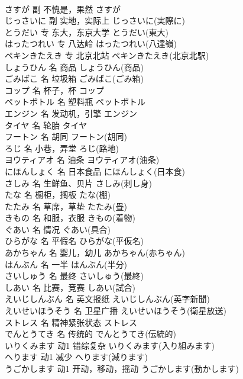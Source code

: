 \documentclass[8pt]{extreport}
\begin{document}
\begin{CJK}{UTF8}{min}
\\	さすが	副	不愧是，果然	さすが	
\\	じっさいに	副	实地，实际上	じっさいに(実際に)	
\\	とうだい	专	东大，东京大学	とうだい(東大)	
\\	はったつれい	专	八达岭	はったつれい(八達嶺)	
\\	ペキンきたえき	专	北京北站	ペキンきたえき(北京北駅)	
\\	しょうひん	名	商品	しょうひん(商品)	
\\	ごみばこ	名	垃圾箱	ごみばこ(ごみ箱)	
\\	コップ	名	杯子，杯	コップ	
\\	ペットボトル	名	塑料瓶	ペットボトル	
\\	エンジン	名	发动机，引擎	エンジン	
\\	タイヤ	名	轮胎	タイヤ	
\\	フートン	名	胡同	フートン(胡同)	
\\	ろじ	名	小巷，弄堂	ろじ(路地)	
\\	ヨウティアオ	名	油条	ヨウティアオ(油条)	
\\	にほんしょく	名	日本食品	にほんしょく(日本食)	
\\	さしみ	名	生鲜鱼、贝片	さしみ(刺し身)	
\\	たな	名	橱柜，搁板	たな(棚)	
\\	たたみ	名	草席，草垫	たたみ(畳)	
\\	きもの	名	和服，衣服	きもの(着物)	
\\	ぐあい	名	情况	ぐあい(具合)	
\\	ひらがな	名	平假名	ひらがな(平仮名)	
\\	あかちゃん	名	婴儿，幼儿	あかちゃん(赤ちゃん)	
\\	はんぶん	名	一半	はんぶん(半分)	
\\	さいしゅう	名	最终	さいしゅう(最終)	
\\	しあい	名	比赛，竞赛	しあい(試合)	
\\	えいじしんぶん	名	英文报纸	えいじしんぶん(英字新聞)	
\\	えいせいほうそう	名	卫星广播	えいせいほうそう(衛星放送)	
\\	ストレス	名	精神紧张状态	ストレス	
\\	でんとうてき	名	传统的	でんとうてき(伝統的)	
\\	いりくみます	动1	错综复杂	いりくみます(入り組みます)	
\\	へります	动1	减少	へります(減ります)	
\\	うごかします	动1	开动，移动，摇动	うごかします(動かします)	

\end{CJK}
\end{document}
